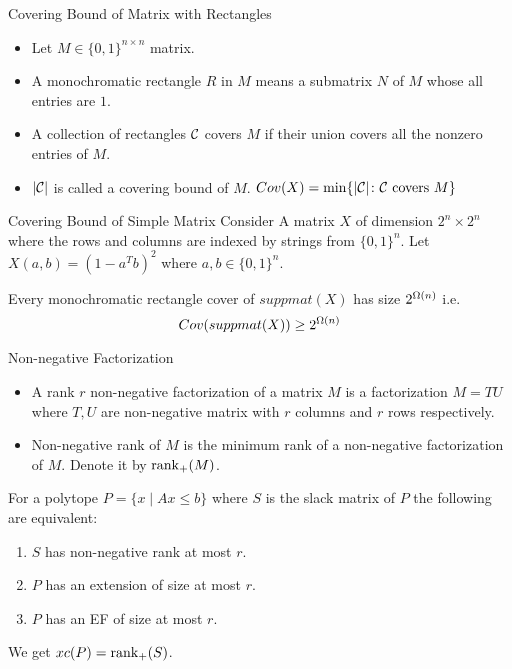 \documentclass[aspectratio=1610]{beamer}
\begin{document}
\begin{frame}{Covering Bound of Matrix with Rectangles}
	\begin{itemize}
		\item Let $M\in\{0,1\}^{n\times n}$ matrix. \pause\vspace*{5mm}
		
		\item A monochromatic rectangle $R$ in $M$ means a submatrix $N$ of $M$ whose all entries are $1$.\pause\vspace*{5mm}
		
		\item A collection of rectangles $\mathcal{C}$ covers $M$ if their union covers all the nonzero entries of $M$.\pause\vspace*{5mm}
		
		\item $|\mathcal{C}|$ is called a covering bound of $M$. $Cov(X)=\min\{|\mathcal{C}|\colon \mathcal{C}\text{ covers $M$}\}$
	\end{itemize}
\end{frame}

\begin{frame}{Covering Bound of Simple Matrix}
	Consider A matrix $X$ of dimension $2^n\times 2^n$ where the rows and columns are indexed by strings from $\{0,1\}^n$. Let $X(a,b)=(1-a^Tb)^2$ where $a,b\in\{0,1\}^n$.\pause\vspace*{5mm}
	
	\begin{theorem}
		Every monochromatic rectangle cover of $suppmat(X)$ has size $2^{\Omega(n)}$ i.e. $$Cov(suppmat(X))\geq 2^{\Omega(n)}$$
	\end{theorem}
\end{frame}

\begin{frame}{Non-negative Factorization}
	\begin{itemize}
		\item A rank $r$ non-negative factorization of a matrix $M$ is a factorization $M=TU$ where $T,U$ are non-negative matrix with $r$ columns and $r$ rows respectively.\pause
		
		\item Non-negative rank of $M$ is the minimum rank of a non-negative factorization of $M$. Denote it by $\operatorname{rank}_+(M)$.
	\end{itemize}\pause
		\begin{theorem}
		For a polytope $P=\{x\mid Ax\leq b\}$ where $S$ is the slack matrix of $P$ the following are equivalent:\begin{enumerate}[label=(\roman*)]
			\item $S$ has non-negative rank at most $r$.
			\item $P$ has an extension of size at most $r$.
			\item $P$ has an EF of size at most $r$.
		\end{enumerate}
	\end{theorem}
	
	We get $xc(P)=\operatorname{rank}_+(S)$.
\end{frame}
\end{document}
